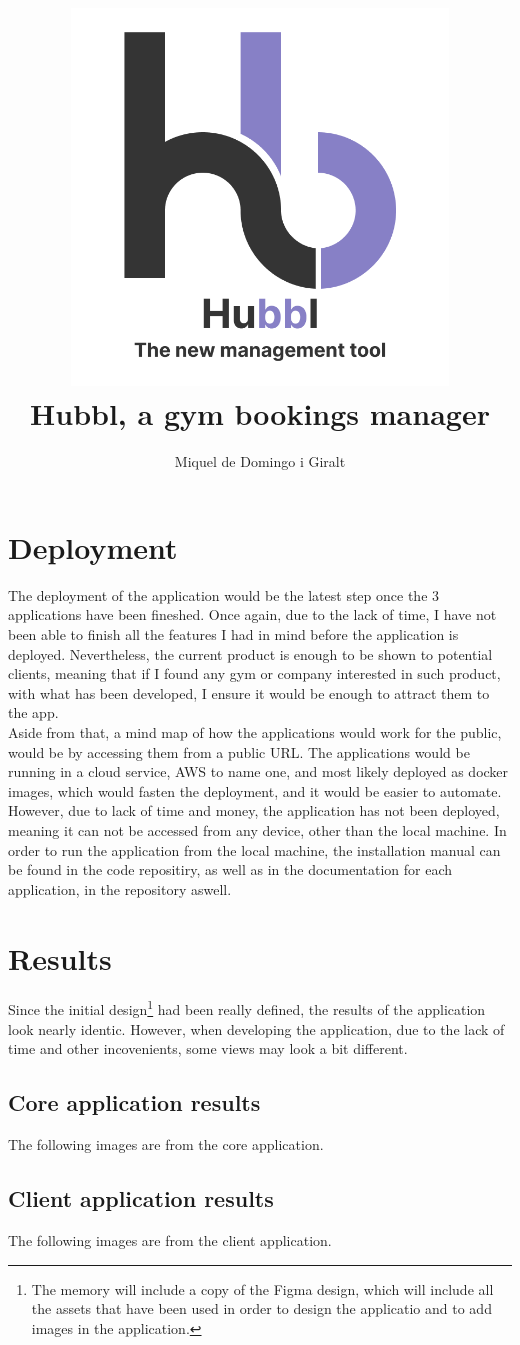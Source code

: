 \documentclass[a4paper, 12pt, oneside]{book}
\title{
	\includegraphics[width=0.75\textwidth]{assets/logo.png}
	\\
	{\huge Hubbl, a gym bookings manager}
}
\author{Miquel de Domingo i Giralt}
\begin{document}
\frontmatter
\maketitle
\mainmatter
\section{Deployment}
The deployment of the application would be the latest step once the 3 applications have been fineshed. Once again, due to the lack of time, I have not been able to finish all the features I had in mind before the application is deployed. Nevertheless, the current product is enough to be shown to potential clients, meaning that if I found any gym or company interested in such product, with what has been developed, I ensure it would be enough to attract them to the app.
\\[8pt]
Aside from that, a mind map of how the applications would work for the public, would be by accessing them from a public URL. The applications would be running in a cloud service, AWS to name one, and most likely deployed as docker images, which would fasten the deployment, and it would be easier to automate. However, due to lack of time and money, the application has not been deployed, meaning it can not be accessed from any device, other than the local machine. In order to run the application from the local machine, the installation manual can be found in the code repositiry, as well as in the documentation for each application, in the repository aswell.
\section{Results}
Since the initial design\footnote{The memory will include a copy of the Figma design, which will include all the assets that have been used in order to design the applicatio and to add images in the application.} had been really defined, the results of the application look nearly identic. However, when developing the application, due to the lack of time and other incovenients, some views may look a bit different.
\subsection{Core application results}
The following images are from the core application.
\subsection{Client application results}
The following images are from the client application.
\end{document}
